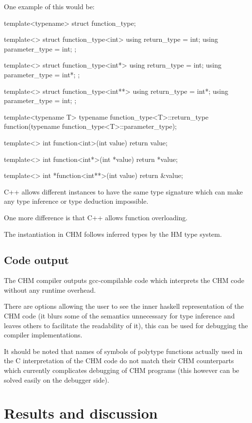 One example of this would be:

template<typename>
struct function_type;

template<>
struct function_type<int> { using return_type = int; using parameter_type = int; };

template<>
struct function_type<int*> { using return_type = int; using parameter_type = int*; };

template<>
struct function_type<int**> { using return_type = int*; using parameter_type = int; };

template<typename T>
typename function_type<T>::return_type function(typename function_type<T>::parameter_type);

template<>
int function<int>(int value) { return value; }

template<>
int function<int*>(int *value) { return *value; }

template<>
int *function<int**>(int value) { return &value; }

C++ allows different instances to have the same type signature which can make any type inference or type deduction
impossible.

One more difference is that C++ allows function overloading. %

The instantiation in CHM follows inferred types by the HM type system.

\section{Code output}

The CHM compiler outputs gcc-compilable code which interprets the CHM code without any runtime overhead. %

There are options allowing the user to see the inner haskell representation of the CHM code (it blurs some of the semantics
unnecessary for type inference and leaves others to facilitate the readability of it), this can be used for debugging
the compiler implementations. %

It should be noted that names of symbols of polytype functions actually used in the C interpretation of the CHM code do not match
their CHM counterparts which currently complicates debugging of CHM programs (this however can be solved easily on the debugger side).

\chapter{Results and discussion}

